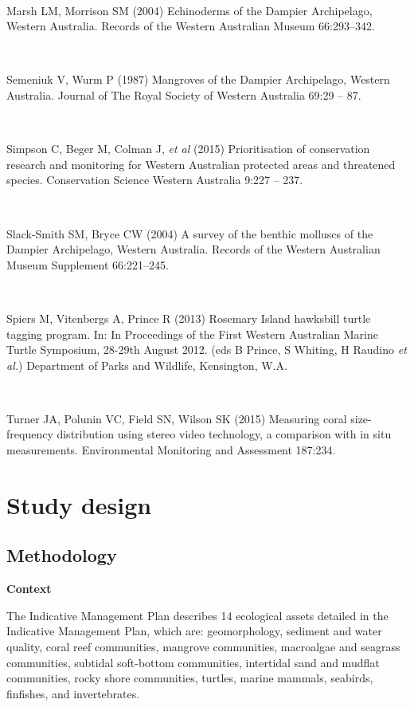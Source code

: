 \documentclass[version=last,
    paper=a4,                               %
    10pt,                                   %
    dvipsnames,
    oneside,                              %
    headings=openany,                       %
    open=any,
    BCOR=7mm,                               %
    DIV=15,     %
]{scrbook}
\begin{document}
~

Marsh LM, Morrison SM (2004) Echinoderms of the Dampier Archipelago,
Western Australia. Records of the Western Australian Museum 66:293--342.

~

Semeniuk V, Wurm P (1987) Mangroves of the Dampier Archipelago, Western
Australia. Journal of The Royal Society of Western Australia 69:29 --
87.

~

Simpson C, Beger M, Colman J, \emph{et al} (2015) Prioritisation of
conservation research and monitoring for Western Australian protected
areas and threatened species. Conservation Science Western Australia
9:227 -- 237.

~

Slack-Smith SM, Bryce CW (2004) A survey of the benthic molluscs of the
Dampier Archipelago, Western Australia. Records of the Western
Australian Museum Supplement 66:221--245.

~

Spiers M, Vitenbergs A, Prince R (2013) Rosemary Island hawksbill turtle
tagging program. In: In Proceedings of the First Western Australian
Marine Turtle Symposium, 28-29th August 2012. (eds B Prince, S Whiting,
H Raudino \emph{et al.}) Department of Parks and Wildlife, Kensington,
W.A.

~

Turner JA, Polunin VC, Field SN, Wilson SK (2015) Measuring coral
size-frequency distribution using stereo video technology, a comparison
with in situ measurements. Environmental Monitoring and Assessment
187:234.



\section*{Study design}


\subsection*{Methodology}

\textbf{Context}

The Indicative Management Plan describes 14 ecological assets detailed
in the Indicative Management Plan, which are: geomorphology, sediment
and water quality, coral reef communities, mangrove communities,
macroalgae and seagrass communities, subtidal soft-bottom communities,
intertidal sand and mudflat communities, rocky shore communities,
turtles, marine mammals, seabirds, finfishes, and invertebrates.
\end{document}
